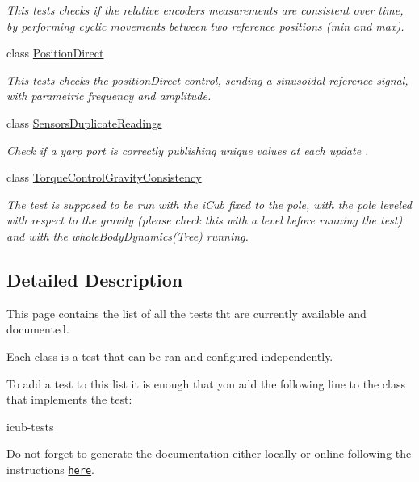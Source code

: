 \begin{DoxyCompactItemize}
\begin{DoxyCompactList}\small\item\em This tests checks if the relative encoders measurements are consistent over time, by performing cyclic movements between two reference positions (min and max). \end{DoxyCompactList}\item 
class \hyperlink{classPositionDirect}{Position\+Direct}
\begin{DoxyCompactList}\small\item\em This tests checks the position\+Direct control, sending a sinusoidal reference signal, with parametric frequency and amplitude. \end{DoxyCompactList}\item 
class \hyperlink{classSensorsDuplicateReadings}{Sensors\+Duplicate\+Readings}
\begin{DoxyCompactList}\small\item\em Check if a yarp port is correctly publishing unique values at each update . \end{DoxyCompactList}\item 
class \hyperlink{classTorqueControlGravityConsistency}{Torque\+Control\+Gravity\+Consistency}
\begin{DoxyCompactList}\small\item\em The test is supposed to be run with the i\+Cub fixed to the pole, with the pole leveled with respect to the gravity (please check this with a level before running the test) and with the whole\+Body\+Dynamics(\+Tree) running. \end{DoxyCompactList}\end{DoxyCompactItemize}


\subsection{Detailed Description}
This page contains the list of all the tests tht are currently available and documented. 

Each class is a test that can be ran and configured independently.

To add a test to this list it is enough that you add the following line to the class that implements the test\+:

\begin{DoxyVerb}\ingroup icub-tests\end{DoxyVerb}


Do not forget to generate the documentation either locally or online following the instructions \href{https://github.com/robotology/icub-tests/}{\tt here}. 